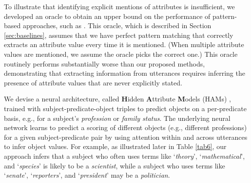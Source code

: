 To illustrate that identifying explicit mentions of attributes is insufficient,
we developed an oracle to obtain an upper bound on the performance of pattern-based approaches, such as \cite{dial7}. This oracle, which is described in Section \ref{sec:baselines}, assumes that we have perfect pattern matching that correctly extracts an attribute value every time it is mentioned.
(When multiple attribute values are mentioned, we assume the oracle picks the correct one.)
This oracle routinely performs substantially worse than our proposed methods, demonstrating that extracting information from utterances requires inferring the presence of attribute values that are never explicitly stated.


We devise a neural architecture, called \textbf{H}idden \textbf{A}ttribute \textbf{M}odels (HAMs) \cite{tigunova:ham:2019}, 
trained with
subject-predicate-object triples to predict objects on a per-predicate basis,
e.g., for a subject's \textit{profession} or \textit{family status}.
The underlying neural network learns to predict a scoring
of different objects (e.g., different professions) for
a given subject-predicate pair
by using attention within and across utterances to infer object values.
For example, as illustrated later in Table \ref{tab6}, our approach infers that a subject
who often uses terms like `\textit{theory}', `\textit{mathematical}', and `\textit{species}' is likely to be a \textit{scientist}, while a subject who uses terms like `\textit{senate}', `\textit{reporters}', and `\textit{president}' may be a \textit{politician}.


